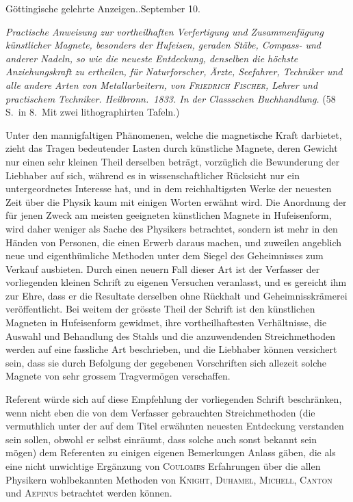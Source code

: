 \vspace{6mm}
\begin{center}\small Göttingische gelehrte Anzeigen..\quad September 10.\end{center}

\textit{Practische Anweisung zur vortheilhaften Verfertigung und Zusammenfügung künstlicher Magnete, besonders der Hufeisen, geraden Stäbe, Compass- und anderer Nadeln, so wie die neueste Entdeckung, denselben die höchste Anziehungskraft zu ertheilen, für Naturforscher, Ärzte, Seefahrer, Techniker und alle andere Arten von Metallarbeitern, von \textup{\textsc{Friedrich Fischer}}, Lehrer und practischem Techniker. Heilbronn.\ \textup{1833.} In der Classschen Buchhandlung.} (58 S.\ in 8.\ Mit zwei lithographirten Tafeln.)

Unter den mannigfaltigen Phänomenen, welche die magnetische Kraft darbietet, zieht das Tragen bedeutender Lasten durch künstliche Magnete, deren Gewicht nur einen sehr kleinen Theil derselben beträgt, vorzüglich die Bewunderung der Liebhaber auf sich, während es in wissenschaftlicher Rücksicht nur ein untergeordnetes Interesse hat, und in dem reichhaltigsten Werke der neuesten Zeit über die Physik kaum mit einigen Worten erwähnt wird. Die Anordnung der für jenen Zweck am meisten geeigneten künstlichen Magnete in Hufeisenform, wird daher weniger als Sache des Physikers betrachtet, sondern ist mehr in den Händen von Personen, die einen Erwerb daraus machen, und zuweilen angeblich neue und eigenthümliche Methoden unter dem Siegel des Geheimnisses zum Verkauf ausbieten. Durch einen neuern Fall dieser Art ist der Verfasser der vorliegenden kleinen Schrift zu eigenen Versuchen veranlasst, und es gereicht ihm zur Ehre, dass er die Resultate derselben ohne Rückhalt und Geheimnisskrämerei veröffentlicht. Bei weitem der grösste Theil der Schrift ist den künstlichen Magneten in Hufeisenform gewidmet, ihre vortheilhaftesten Verhältnisse, die Auswahl und Behandlung des Stahls und die anzuwendenden Streichmethoden werden auf eine fassliche Art beschrieben, und die Liebhaber können versichert sein, dass sie durch Befolgung der gegebenen Vorschriften sich allezeit solche Magnete von sehr grossem Tragvermögen verschaffen.

Referent würde sich auf diese Empfehlung der vorliegenden Schrift beschränken, wenn nicht eben die von dem Verfasser gebrauchten Streichmethoden (die vermuthlich unter der auf dem Titel erwähnten neuesten Entdeckung verstanden sein sollen, obwohl er selbst einräumt, dass solche auch sonst bekannt sein mögen) dem Referenten zu einigen eigenen Bemerkungen Anlass gäben, die als eine nicht unwichtige Ergänzung von \textsc{Coulombs} Erfahrungen über die allen Physikern wohlbekannten Methoden von \textsc{Knight}, \textsc{Duhamel}, \textsc{Michell}, \textsc{Canton} und \textsc{Aepinus} betrachtet werden können.

